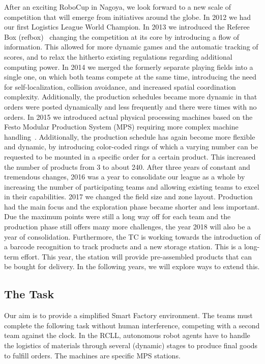 \documentclass[12pt,twoside]{article}
\begin{document}
 After an exciting RoboCup in Nagoya, we look forward to a new scale of
 competition that will emerge from initiatives around the globe. In 2012 we had
 our first Logistics League World Champion.  In 2013 we introduced the Referee
 Box (refbox)~\cite{RCI-RefBox} changing the competition at its core by
 introducing a flow of information. This allowed for more dynamic games and the
 automatic tracking of scores, and to relax the hitherto existing regulations
 regarding additional computing power. In 2014 we merged the formerly separate
 playing fields into a single one, on which both teams compete at the same time,
 introducing the need for self-localization, collision avoidance, and increased
 spatial coordination complexity. Additionally, the production schedules became
 more dynamic in that orders were posted dynamically and less frequently and
 there were times with no orders. In 2015 we introduced actual physical
 processing machines based on the Festo Modular Production System (MPS)
 requiring more complex machine handling~\cite{wdrl2013}. Additionally, the
 production schedule has again become more flexible and dynamic, by introducing
 color-coded rings of which a varying number can be requested to be mounted in a
 specific order for a certain product. This increased the number of products
 from 3 to about 240. After three years of constant and tremendous changes, 2016
 was a year to consolidate our league as a whole by increasing the number of
 participating teams and allowing existing teams to excel in their
 capabilities. 2017 we changed the field size and zone layout. Production had
 the main focus and the exploration phase became shorter and less important.
 Due the maximum points were still a long way off for each team and the
 production phase still offers many more challenges, the year 2018 will also be
 a year of consolidation.  Furthermore, the TC is working towards the
 introduction of a barcode recognition to track products and a new storage
 station.  This is a long-term effort. This year, the station will provide
 pre-assembled products that can be bought for delivery.  In the following
 years, we will explore ways to extend this.

\subsection{The Task}
\label{sec:task}

Our aim is to provide a simplified Smart Factory environment. The
teams must complete the following task without human interference,
competing with a second team against the clock. In the RCLL,
autonomous robot agents have to handle the logistics of materials
through several (dynamic) stages to produce final goods to fulfill
orders. The machines are specific MPS stations.
\end{document}
